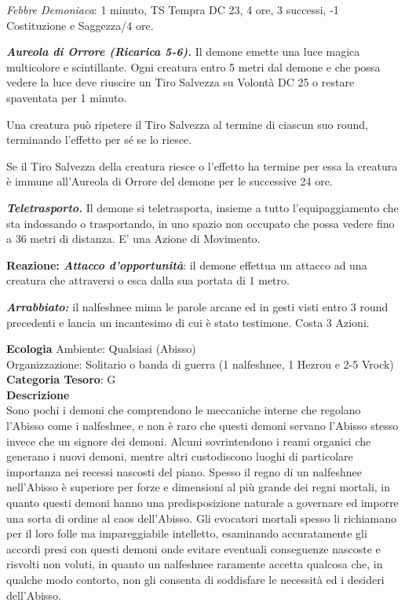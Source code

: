 \begin{multicols}{2}
{\emph{Febbre Demoniaca}: 1 minuto, TS Tempra DC 23, 4 ore, 3 successi, -1 Costituzione e Saggezza/4 ore.

\emph{\textbf{Aureola di Orrore (Ricarica 5-6).}} Il demone emette una luce magica multicolore e scintillante. Ogni creatura entro 5 metri dal demone e che possa vedere la luce deve riuscire un Tiro Salvezza su Volontà DC 25 o restare spaventata per 1 minuto.

Una creatura può ripetere il Tiro Salvezza al termine di ciascun suo round, terminando l'effetto per sé se lo riesce.

Se il Tiro Salvezza della creatura riesce o l'effetto ha termine per essa la creatura è immune all'Aureola di Orrore del demone per le successive 24 ore.

\emph{\textbf{Teletrasporto.}} Il demone si teletrasporta, insieme a tutto l'equipaggiamento che sta indossando o trasportando, in uno spazio non occupato che possa vedere fino a 36 metri di distanza. E' una Azione di Movimento.

\textbf{Reazione: \emph{Attacco d'opportunità}}: il demone effettua un attacco ad una creatura che attraversi o esca dalla sua portata di 1 metro.

\emph{\textbf{Arrabbiato:}} il nalfeshnee mima le parole arcane ed in gesti visti entro 3 round precedenti e lancia un incantesimo di cui è stato testimone. Costa 3 Azioni.

\textbf{Ecologia}
Ambiente: Qualsiasi (Abisso)\\
Organizzazione: Solitario o banda di guerra (1 nalfeshnee, 1 Hezrou e 2-5 Vrock)\\
\textbf{Categoria Tesoro}: G\\
\textbf{Descrizione}\\
Sono pochi i demoni che comprendono le meccaniche interne che regolano l'Abisso come i nalfeshnee, e non è raro che questi demoni servano l'Abisso stesso invece che un signore dei demoni. Alcuni sovrintendono i reami organici che generano i nuovi demoni, mentre altri custodiscono luoghi di particolare importanza nei recessi nascosti del piano. Spesso il regno di un nalfeshnee nell'Abisso è superiore per forze e dimensioni al più grande dei regni mortali, in quanto questi demoni hanno una predisposizione naturale a governare ed imporre una sorta di ordine al caos dell'Abisso. Gli evocatori mortali spesso li richiamano per il loro folle ma impareggiabile intelletto, esaminando accuratamente gli accordi presi con questi demoni onde evitare eventuali conseguenze nascoste e risvolti non voluti, in quanto un nalfeshnee raramente accetta qualcosa che, in qualche modo contorto, non gli consenta di soddisfare le necessità ed i desideri dell'Abisso.

}
\end{multicols}
